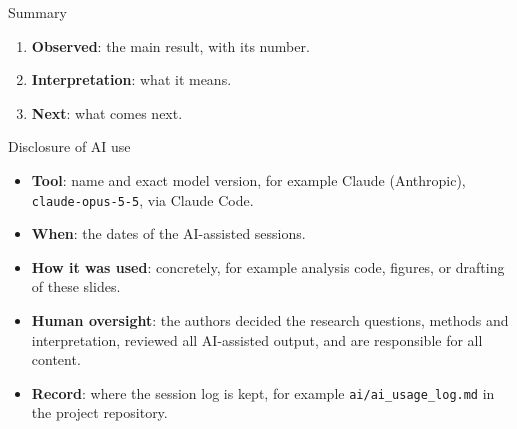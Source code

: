 \documentclass[aspectratio=169,10pt]{beamer}
\begin{document}
\begin{frame}{Summary}
\begin{enumerate}
  \item \textbf{Observed}: the main result, with its number.
  \item \textbf{Interpretation}: what it means.
  \item \textbf{Next}: what comes next.
\end{enumerate}
\end{frame}




\begin{frame}{Disclosure of AI use}
\small
\begin{itemize}
  \item \textbf{Tool}: name and exact model version, for example Claude (Anthropic),
    \texttt{claude-opus-5-5}, via Claude Code.
  \item \textbf{When}: the dates of the AI-assisted sessions.
  \item \textbf{How it was used}: concretely, for example analysis code, figures, or drafting of
    these slides.
  \item \textbf{Human oversight}: the authors decided the research questions, methods and
    interpretation, reviewed all AI-assisted output, and are responsible for all content.
  \item \textbf{Record}: where the session log is kept, for example \texttt{ai/ai\_usage\_log.md}
    in the project repository.
\end{itemize}
\end{frame}


\end{document}
